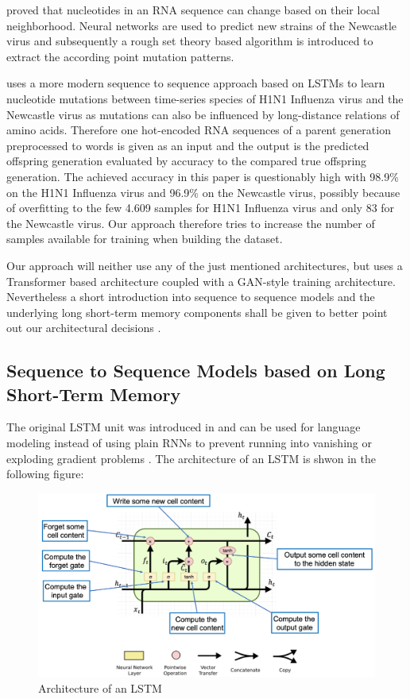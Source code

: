 \cite{Salama2016} proved that nucleotides in an \ac{RNA} sequence can change based on their local neighborhood. Neural networks are used to predict new strains of the Newcastle virus and subsequently a rough set theory based algorithm is introduced to extract the according point mutation patterns. 

\cite{Mohamed2021} uses a more modern sequence to sequence approach based on \acp{LSTM} to learn nucleotide mutations between time-series species of H1N1 Influenza virus and the Newcastle virus as mutations can also be influenced by long-distance relations of amino acids. Therefore one hot-encoded \ac{RNA} sequences of a parent generation preprocessed to words is given as an input and the output is the predicted offspring generation evaluated by accuracy to the compared true offspring generation. The achieved accuracy in this paper is questionably high with 98.9\% on the H1N1 Influenza virus and 96.9\% on the Newcastle virus, possibly because of overfitting to the few 4.609 samples for H1N1 Influenza virus and only 83 for the Newcastle virus. Our approach therefore tries to increase the number of samples available for training when building the dataset. 

Our approach will neither use any of the just mentioned architectures, but uses a Transformer based architecture coupled with a GAN-style training architecture. Nevertheless a short introduction into sequence to sequence models and the underlying long short-term memory components shall be given to better point out our architectural decisions . 

\subsection{Sequence to Sequence Models based on Long Short-Term Memory} \label{fundamentalsE}


The original \ac{LSTM} unit was introduced in \cite{Hochreiter1997} and can be used for language modeling instead of using plain \acp{RNN} to prevent running into vanishing or exploding gradient problems \cite{Sundermeyer2012}. The architecture of an \ac{LSTM} is shwon in the following figure:

\begin{figure}[ht]
	\centering
	\includegraphics[width=0.8\linewidth]{figures/lstm_architecture.png}
	\caption{Architecture of an \ac{LSTM} \cite{Gertz2020}}
	\label{lstm_architecture}
\end{figure}

